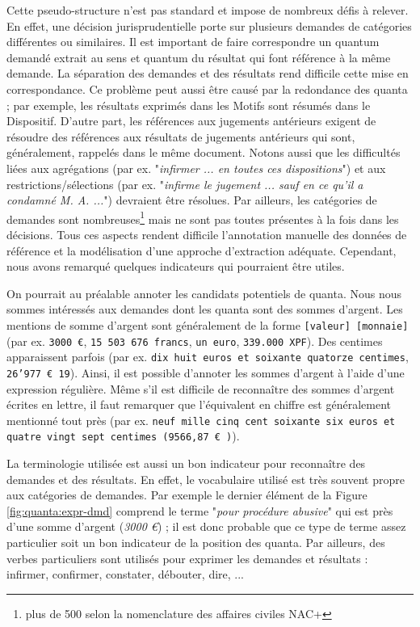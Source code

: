  Cette pseudo-structure n'est pas standard et impose de nombreux défis à relever. En effet, une décision jurisprudentielle porte sur plusieurs demandes de catégories différentes ou similaires. Il est important de faire correspondre un quantum demandé extrait au sens et quantum du résultat qui font référence à la même demande. La séparation des demandes et des résultats rend difficile cette mise en correspondance. Ce problème peut aussi être causé par la redondance des quanta ; par exemple, les résultats exprimés dans les Motifs sont résumés dans le Dispositif. D'autre part, les références aux jugements antérieurs exigent de résoudre des références aux résultats de jugements antérieurs qui sont, généralement, rappelés dans le même document. Notons aussi que les difficultés liées aux agrégations (par ex. "\textit{infirmer ... en toutes ces dispositions}") et aux restrictions/sélections (par ex. "\textit{infirme le jugement ... sauf en ce qu'il a condamné M. A. ...}") devraient être résolues. Par ailleurs, les catégories de demandes sont nombreuses\footnote{plus de 500 selon la nomenclature des affaires civiles NAC+} mais ne sont pas toutes présentes à la fois dans les décisions. Tous ces aspects rendent difficile l'annotation manuelle des données de référence et la modélisation d'une approche d'extraction adéquate. Cependant, nous avons remarqué quelques indicateurs qui pourraient être utiles.

On pourrait au préalable annoter les candidats potentiels de quanta. Nous nous sommes intéressés aux demandes dont les quanta sont des sommes d'argent. Les mentions de somme d'argent sont généralement de la forme \og \texttt{[valeur] [monnaie]} \fg{} (par ex. \texttt{3000 \euro}, \texttt{15 503 676 francs}, \texttt{un euro}, \texttt{339.000 XPF}). Des centimes apparaissent parfois (par ex. \texttt{dix huit euros et soixante quatorze centimes}, \texttt{26'977 \euro{}  19}).  Ainsi, il est possible d'annoter les sommes d'argent à l'aide d'une expression régulière. Même s'il est difficile de reconnaître des sommes d'argent écrites en lettre, il faut remarquer que l'équivalent en chiffre est généralement mentionné tout près (par ex. \texttt{neuf mille cinq cent soixante six euros et quatre vingt sept centimes (9566,87 \euro{}  )}). 

La terminologie utilisée est aussi un bon indicateur pour reconnaître des demandes et des résultats. En effet, le vocabulaire utilisé est très souvent propre aux catégories de demandes. Par exemple le dernier élément de la Figure \ref{fig:quanta:expr-dmd} comprend le terme "\textit{pour procédure abusive}" qui est près d'une somme d'argent (\textit{3000 \euro{}}) ; il est donc probable que ce type de terme assez particulier soit un bon indicateur de la position des quanta. Par ailleurs, des verbes particuliers sont utilisés pour exprimer les demandes et résultats : infirmer, confirmer, constater, débouter, dire, ... %




